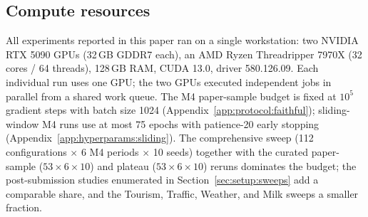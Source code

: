 \subsection{Compute resources}
\label{app:protocol:compute}

All experiments reported in this paper ran on a single workstation: two
NVIDIA RTX 5090 GPUs (32\,GB GDDR7 each), an AMD Ryzen Threadripper 7970X
(32 cores / 64 threads), 128\,GB RAM, CUDA 13.0, driver 580.126.09. Each
individual run uses one GPU; the two GPUs executed independent jobs in
parallel from a shared work queue. The M4 paper-sample budget is fixed at
$10^{5}$ gradient steps with batch size 1024
(Appendix~\ref{app:protocol:faithful}); sliding-window M4 runs use at most
75 epochs with patience-20 early stopping
(Appendix~\ref{app:hyperparams:sliding}). The comprehensive sweep
(112 configurations $\times$ 6 M4 periods $\times$ 10 seeds) together with
the curated paper-sample ($53 \times 6 \times 10$) and plateau
($53 \times 6 \times 10$) reruns dominates the budget; the post-submission
studies enumerated in Section~\ref{sec:setup:sweeps} add a comparable share,
and the Tourism, Traffic, Weather, and Milk sweeps a smaller fraction.

